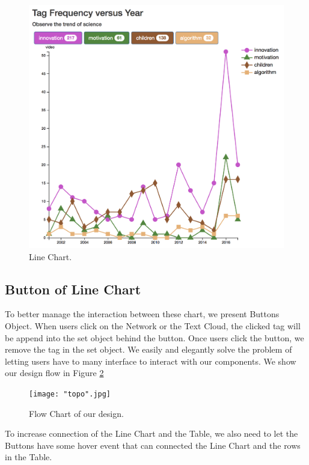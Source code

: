 \documentclass{report}
\numberwithin{figure}{section}
\begin{document}
\begin{figure}
\begin{center}
\includegraphics[scale=0.4]{linechart}
\caption{Line Chart.}
\label{fig:linechart}
\end{center}
\end{figure}



\subsection{Button of Line Chart}
\quad To better manage the interaction between these chart, we present Buttons Object. When users click on the Network or the Text Cloud, the clicked tag will be append into the set object behind the button. Once users click the button, we remove the tag in the set object. We easily and elegantly solve the problem of letting users have to many interface to interact with our components. We show our design flow in Figure \ref{fig:topo}

\begin{figure}
\begin{center}
\texttt{[image: "topo".jpg]}
\caption{Flow Chart of our design.}
\label{fig:topo}
\end{center}
\end{figure}


\quad To increase connection of the Line Chart and the Table, we also need to let the Buttons have some hover event that can connected the Line Chart and the rows in the Table.
\end{document}
